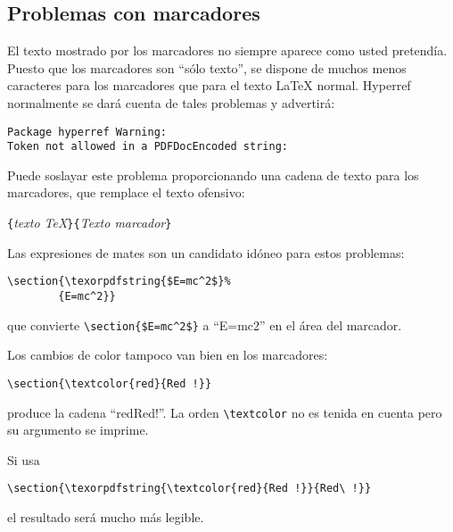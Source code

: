 \subsection{Problemas con marcadores}

El texto mostrado por los marcadores no siempre aparece como usted
pretendía.  Puesto que los marcadores son ``sólo texto'', se dispone
de muchos menos caracteres para los marcadores que para el texto
\LaTeX{} normal.  
Hyperref normalmente se dará cuenta de tales problemas y advertirá:
\begin{code}
\begin{verbatim}
Package hyperref Warning: 
Token not allowed in a PDFDocEncoded string:
\end{verbatim}
\end{code}
Puede soslayar este problema proporcionando una cadena de texto para
los marcadores, que remplace el texto ofensivo:
\begin{lscommand}
\verb|{|\emph{texto \TeX{}}\verb|}{|\emph{Texto
    marcador}\verb|}|
\end{lscommand}

Las expresiones de mates son un candidato idóneo para estos problemas:
\begin{code}
\begin{verbatim}
\section{\texorpdfstring{$E=mc^2$}%
        {E=mc^2}}
\end{verbatim}
\end{code}
que convierte \verb+\section{$E=mc^2$}+ a ``E=mc2'' en el área del
marcador.

Los cambios de color tampoco van bien en los marcadores:
\begin{code}
\verb+\section{\textcolor{red}{Red !}}+
\end{code}
produce la cadena ``redRed!''.  La orden \verb+\textcolor+ no es
tenida en cuenta pero su argumento se imprime.

Si usa
\begin{code}
\verb+\section{\texorpdfstring{\textcolor{red}{Red !}}{Red\ !}}+
\end{code}
el resultado será mucho más legible.

